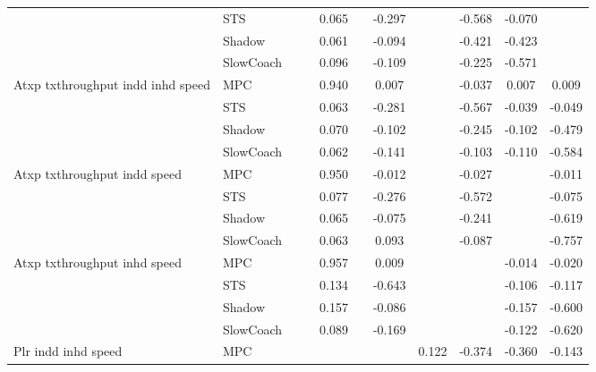 \begin{tabular}{|l|l|*{9}{c|}}
                              & STS &       &        &     0.065 &     & -0.297 &     &  -0.568 &  -0.070 &       \\
                              & Shadow &       &        &     0.061 &     & -0.094 &     &  -0.421 &  -0.423 &       \\
                              & SlowCoach &       &        &     0.096 &     & -0.109 &     &  -0.225 &  -0.571 &       \\
\midrule
Atxp txthroughput indd inhd speed    & MPC &       &        &     0.940 &     &  0.007 &     &  -0.037 &   0.007 &    0.009 \\
                              & STS &       &        &     0.063 &     & -0.281 &     &  -0.567 &  -0.039 &   -0.049 \\
                              & Shadow &       &        &     0.070 &     & -0.102 &     &  -0.245 &  -0.102 &   -0.479 \\
                              & SlowCoach &       &        &     0.062 &     & -0.141 &     &  -0.103 &  -0.110 &   -0.584 \\
\midrule
Atxp txthroughput indd speed    & MPC &       &        &     0.950 &     & -0.012 &     &  -0.027 &      &   -0.011 \\
                              & STS &       &        &     0.077 &     & -0.276 &     &  -0.572 &      &   -0.075 \\
                              & Shadow &       &        &     0.065 &     & -0.075 &     &  -0.241 &      &   -0.619 \\
                              & SlowCoach &       &        &     0.063 &     &  0.093 &     &  -0.087 &      &   -0.757 \\
\midrule
Atxp txthroughput inhd speed    & MPC &       &        &     0.957 &     &  0.009 &     &      &  -0.014 &   -0.020 \\
                              & STS &       &        &     0.134 &     & -0.643 &     &      &  -0.106 &   -0.117 \\
                              & Shadow &       &        &     0.157 &     & -0.086 &     &      &  -0.157 &   -0.600 \\
                              & SlowCoach &       &        &     0.089 &     & -0.169 &     &      &  -0.122 &   -0.620 \\
\midrule
Plr indd inhd speed    & MPC &       &        &        &     &     &  0.122 &  -0.374 &  -0.360 &   -0.143 \\

\end{tabular}
